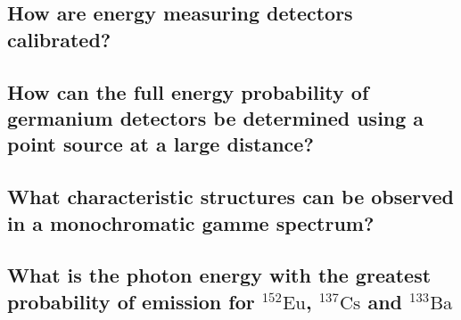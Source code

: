 \subsection*{How are energy measuring detectors calibrated?}

\subsection*{How can the full energy probability of germanium 
detectors be determined using a point source at a large distance?}

\subsection*{What characteristic structures can be observed in a 
monochromatic gamme spectrum?}

\subsection*{What is the photon energy with the greatest probability
of emission for $^{152}\text{Eu}$, $^{137}\text{Cs}$ and $^{133}\text{Ba}$}
\subsection*{}
